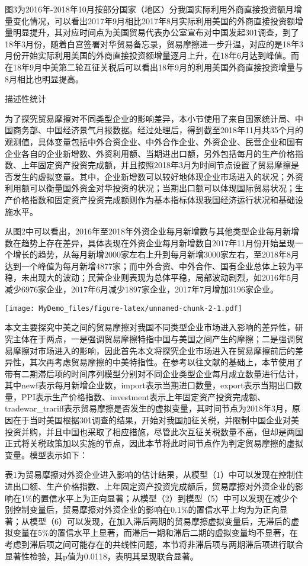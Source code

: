 \documentclass[]{article}
\begin{document}
图3为2016年-2018年10月按部分国家（地区）分我国实际利用外商直接投资额月增量变化情况，可以看出2017年9月相比2017年8月实际利用美国的外商直接投资额增量明显提升，其对应时间点为美国贸易代表办公室宣布对中国发起301调查，到了18年3月份，随着白宫签署对华贸易备忘录，贸易摩擦进一步升温，对应的是18年3月份开始实际利用美国的外商直接投资额增量逐月上升，在18年6月达到峰值。而在18年9月中美第二轮互征关税后可以看出18年9月的利用美国外商直接投资增量与8月相比也明显提高。

描述性统计

为了探究贸易摩擦对不同类型企业的影响差异，本小节使用了来自国家统计局、中国商务部、中国经济景气月报数据。经过处理后，得到截至2018年11月共35个月的观测值，具体变量包括中外合资企业、中外合作企业、外资企业、民营企业和国有企业各自的企业新增数、外资利用额、当期进出口额，另外包括每月的生产价格指数、上年固定资产投资完成额，并且按照2018年3月为时间节点设置了贸易摩擦是否发生的虚拟变量。其中，企业新增数可以较好地体现企业市场进入的状况；外资利用额可以衡量国外资金对华投资的状况；当期出口额可以体现国际贸易状况；生产价格指数和固定资产投资完成额则作为基本指标体现我国经济运行状况和基础设施水平。

从图2中可以看出，2016年至2018年外资企业每月新增数与其他类型企业每月新增数在趋势上存在差异，具体表现在外资企业每月新增数自2017年11月份开始呈现一个增长的趋势，从每月新增2000家左右上升到每月新增3000家左右，至2018年8月达到一个峰值为每月新增4877家；而中外合资、中外合作、国有企业总体上较为平稳，未出现大的波动；民营企业则表现为总体平稳，局部波动剧烈，如2016年5月减少6976家企业，2017年6月减少1897家企业，2017年7月增加3196家企业。

\texttt{[image: MyDemo\_files/figure-latex/unnamed-chunk-2-1.pdf]}

本文主要探究中美之间的贸易摩擦对我国不同类型企业市场进入影响的差异性，研究主体在于两点，一是强调贸易摩擦特指中国与美国之间产生的摩擦；二是强调贸易摩擦对市场进入的影响，因此首先本文将探究企业市场进入在贸易摩擦前后的差异性，其次再考虑贸易摩擦的中美特指性。在参考以往文献的基础上，本节使用了带有二期滞后项的时间序列模型分别对不同企业类型企业每月成立数量进行估计，其中newf表示每月新增企业数，import表示当期进口数量，export表示当期出口数量，PPI表示生产价格指数、investment表示上年固定资产投资完成额、tradewar\_trariff表示贸易摩擦是否发生的虚拟变量，其时间节点为2018年3月，原因在于当时美国根据301调查的结果，开始对我国加征关税，并限制中国企业对美投资并购，并且中国也采取了相应措施，尽管此次互征关税数量不高，但却是两国正式将关税政策加以实施的节点，因此本节将此时间节点作为判定贸易摩擦的虚拟变量。模型表示如下：

表1为贸易摩擦对外资企业进入影响的估计结果，从模型（1）中可以发现在控制住进出口额、生产价格指数、上年固定资产投资完成额后，贸易摩擦对外资企业的影响在1\%的置信水平上为正向显著；从模型（2）到模型（5）中可以发现在减少个别控制变量后，贸易摩擦对外资企业的影响在0.1\%的置信水平上均为为正向显著；从模型（6）可以发现，在加入滞后两期的贸易摩擦虚拟变量后，无滞后的虚拟变量在5\%的置信水平上显著，而滞后一期和滞后二期的虚拟变量均不显著，在考虑到滞后项之间可能存在的共线性问题，本节将非滞后项与两期滞后项进行联合显著性检验，其p值为0.0118，表明其呈现联合显著。
\end{document}
